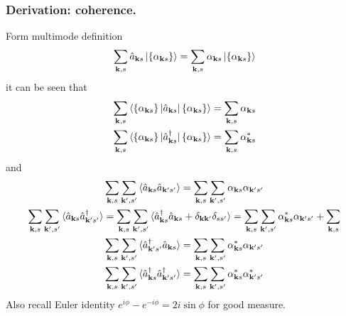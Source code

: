 \documentclass[../../../main.tex]{subfiles}
\begin{document}
\subsubsection{Derivation: coherence.}
Form multimode definition
\begin{equation*}
  \sum_{\mathbf{k },s} \hat{a}_{\mathbf{k }s} \ket{\left\{ \alpha_{\mathbf{k }s} \right\} }=\sum_{\mathbf{k },s} \alpha_{\mathbf{k }s} \ket{\left\{ \alpha_{\mathbf{k }s} \right\} }
\end{equation*}
it can be seen that
\begin{align*}
  \sum_{\mathbf{k },s}  \braket{\left\{ \alpha_{\mathbf{k }s } \right\}    | \hat{a}_{\mathbf{k }s} | \left\{ \alpha_{\mathbf{k }s} \right\} }         & =  \sum_{\mathbf{k },s} \alpha_{\mathbf{k }s}   \\
  \sum_{\mathbf{k },s} \braket{\left\{ \alpha_{\mathbf{k }s } \right\}    | \hat{a}^\dagger_{\mathbf{k }s}  | \left\{ \alpha_{\mathbf{k }s} \right\} } & = \sum_{\mathbf{k },s} \alpha_{\mathbf{k }s} ^*
\end{align*}
and
\begin{gather*}
  \sum_{\mathbf{k},s}\sum_{\mathbf{k}',s'} \braket{\hat{a}_{\mathbf{k }s}   \hat{a}_{\mathbf{k }'s'} }
  =\sum_{\mathbf{k},s}\sum_{\mathbf{k}',s'}  \alpha_{\mathbf{k}s}\alpha_{\mathbf{k}'s'}
  \\
  \sum_{\mathbf{k},s}\sum_{\mathbf{k}',s'} \braket{\hat{a}_{\mathbf{k }s}   \hat{a}^\dagger_{\mathbf{k }'s'} }
  =\sum_{\mathbf{k},s}\sum_{\mathbf{k}',s'} \braket{\hat{a}^\dagger_{\mathbf{k }s} \hat{a}_{\mathbf{k }s} + \delta_{\mathbf{k }\mathbf{k}'}\delta_{ss'}}
  =
  \sum_{\mathbf{k},s} \sum_{\mathbf{k}',s'}\alpha_{\mathbf{k}s}^* \alpha_{\mathbf{k}'s'}
  +\sum_{\mathbf{k},s}
  \\
  \sum_{\mathbf{k},s}\sum_{\mathbf{k}',s'} \braket{\hat{a}^\dagger_{\mathbf{k }'s'}\hat{a}_{\mathbf{k }s}}
  =
  \sum_{\mathbf{k},s} \sum_{\mathbf{k}',s'}\alpha^{*}_{\mathbf{k}s}  \alpha_{\mathbf{k}'s'}
  \\
  \sum_{\mathbf{k},s}\sum_{\mathbf{k}',s'} \braket{\hat{a}^\dagger_{\mathbf{k }s}   \hat{a}^\dagger_{\mathbf{k }'s'} }
  = \sum_{\mathbf{k},s} \sum_{\mathbf{k}',s'} \alpha^{*}_{\mathbf{k}s}  \alpha^{*}_{\mathbf{k}'s'}
\end{gather*}
Also recall Euler identity $  e ^{i\phi}-e ^{-i\phi}=2i \sin \phi$ for good measure.
\end{document}
